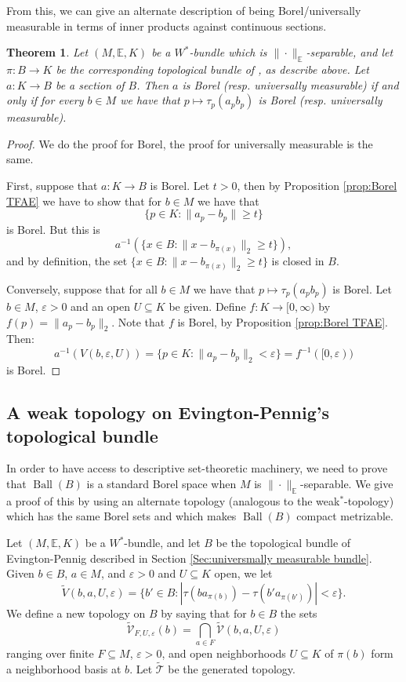\documentclass[10pt]{amsart}
\newtheorem{thm}{Theorem}[section]
\theoremstyle{definition}
\numberwithin{equation}{section}
\newcommand{\bE}{{\mathbb E}}
\newcommand{\cT}{{\mathcal T}}
\DeclareMathOperator{\Ball}{Ball}
\begin{document}
From this, we can give an alternate description of being Borel/universally measurable in terms of inner products against continuous sections.

\begin{thm}
Let $(M,\bE,K)$ be a $W^{*}$-bundle which is $\|\cdot\|_{\bE}$-separable, and let $\pi\colon B\to K$ be the corresponding topological bundle of \cite{EPBundles}, as describe above. Let $a\colon K\to B$ be a section of $B$. Then
$a$ is Borel (resp. universally measurable) if and only if for every $b\in M$ we have that $p\mapsto \tau_{p}(a_{p}b_{p})$ is Borel (resp. universally measurable).
\end{thm}

\begin{proof}
We do the proof for Borel, the proof for universally measurable is the same. 

First, suppose that $a\colon K\to B$ is Borel. 
Let $t>0$, then by Proposition \ref{prop:Borel TFAE} we have to show that for $b\in M$ we have that
\[\{p\in K:\|a_{p}-b_{p}\|\geq t\}\]
is Borel. But this is 
\[a^{-1}(\{x\in B:\|x-b_{\pi(x)}\|_{2}\geq t\}),\]
and by definition, the set $\{x\in B:\|x-b_{\pi(x)}\|_{2}\geq t\}$ is closed in $B$.

Conversely, suppose that for all $b\in M$ we have that $p\mapsto \tau_{p}(a_{p}b_{p})$ is Borel. Let $b\in M$, $\varepsilon>0$ and an open $U\subseteq K$ be given. Define $f\colon K\to [0,\infty)$ by $f(p)=\|a_{p}-b_{p}\|_{2}$. Note that $f$ is Borel, by Proposition \ref{prop:Borel TFAE}.
Then:
\[a^{-1}(V(b,\varepsilon,U))=\{p\in K:\|a_{p}-b_{p}\|_{2}<\varepsilon\}=f^{-1}([0,\varepsilon))\]
is Borel.



\end{proof}


\subsection{A weak topology on Evington-Pennig's topological bundle}

In order to have access to descriptive set-theoretic machinery, we need to prove that $\Ball(B)$ is a standard Borel space when $M$ is $\|\cdot\|_{\bE}$-separable. We give a proof of this by using an alternate topology (analogous to the weak$^{*}$-topology) which has the same Borel sets and which makes $\Ball(B)$ compact metrizable.

Let $(M,\bE,K)$ be a $W^{*}$-bundle, and let $B$ be the topological bundle of Evington-Pennig described in Section \ref{Sec:universmally measurable bundle}. Given $b\in B$, $a\in M$, and $\varepsilon>0$ and $U\subseteq K$ open, we let 
\[\widetilde{V}(b,a,U,\varepsilon)=\{b'\in B:|\tau(ba_{\pi(b)})-\tau(b'a_{\pi(b')})|<\varepsilon\}.\]
We define a new topology on $B$ by saying that for $b\in B$ the sets
\[\widetilde{\mathcal{V}}_{F,U,\varepsilon}(b)=\bigcap_{a\in F}\widetilde{\mathcal{V}}(b,a,U,\varepsilon)\]
ranging over finite $F\subseteq M$, $\varepsilon>0$, and open neighborhoods $U\subseteq K$ of $\pi(b)$ form a neighborhood basis at $b$. Let $\widetilde{\cT}$ be the generated topology.
\end{document}
